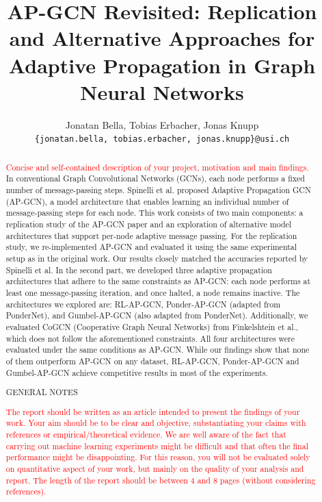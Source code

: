 \documentclass{gdl}
\begin{document}
\title{AP-GCN Revisited: Replication and Alternative Approaches for Adaptive Propagation in Graph Neural Networks}

\author{%
Jonatan Bella, Tobias Erbacher, Jonas Knupp\\
\texttt{\{jonatan.bella, tobias.erbacher, jonas.knupp\}@usi.ch}
}

\begin{abstract}
\textcolor{red}{Concise and self-contained description of your project, motivation and main findings.}
In conventional Graph Convolutional Networks (GCNs), each node performs a fixed number of message-passing steps. Spinelli et al. proposed Adaptive Propagation GCN (AP-GCN), a model architecture that enables learning an individual number of message-passing steps for each node. This work consists of two main components: a replication study of the AP-GCN paper and an exploration of alternative model architectures that support per-node adaptive message passing.
For the replication study, we re-implemented AP-GCN and evaluated it using the same experimental setup as in the original work. Our results closely matched the accuracies reported by Spinelli et al.
In the second part, we developed three adaptive propagation architectures that adhere to the same constraints as AP-GCN: each node performs at least one message-passing iteration, and once halted, a node remains inactive. The architectures we explored are: RL-AP-GCN, Ponder-AP-GCN (adapted from PonderNet), and Gumbel-AP-GCN (also adapted from PonderNet). Additionally, we evaluated CoGCN (Cooperative Graph Neural Networks) from Finkelshtein et al., which does not follow the aforementioned constraints.
All four architectures were evaluated under the same conditions as AP-GCN. While our findings show that none of them outperform AP-GCN on any dataset, RL-AP-GCN, Ponder-AP-GCN and Gumbel-AP-GCN achieve competitive results in most of the experiments. 


\begin{center}
    \sf\large\color{red} GENERAL NOTES
\end{center}

\textcolor{red}{The report should be written as an article intended to present the findings of your work. Your aim should be to be clear and objective, substantiating your claims with references or empirical/theoretical evidence.
We are well aware of the fact that carrying out machine learning experiments might be difficult and that often the final performance might be disappointing. For this reason, you will not be evaluated solely on quantitative aspect of your work, but mainly on the quality of your analysis and report.
The length of the report should be between 4 and 8 pages (without considering references).}

\end{abstract}
\end{document}
